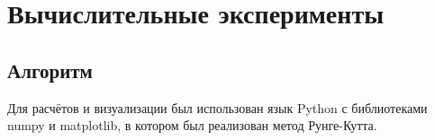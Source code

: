\section{Вычислительные эксперименты}
    \subsection{Алгоритм}
        Для расчётов и визуализации был использован язык Python с библиотеками numpy и matplotlib, в котором был реализован метод Рунге-Кутта.

        